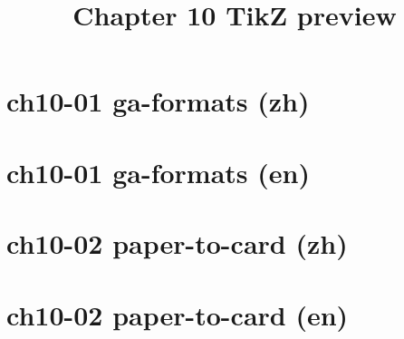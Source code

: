 \documentclass[11pt,a4paper,landscape]{article}
\title{Chapter 10 TikZ preview}
\date{}
\begin{document}
\maketitle

\section*{ch10-01 ga-formats (zh)}
\resizebox{\linewidth}{!}{}
\newpage

\section*{ch10-01 ga-formats (en)}
\resizebox{\linewidth}{!}{}
\newpage

\section*{ch10-02 paper-to-card (zh)}
\resizebox{\linewidth}{!}{}
\newpage

\section*{ch10-02 paper-to-card (en)}
\resizebox{\linewidth}{!}{}
\end{document}

